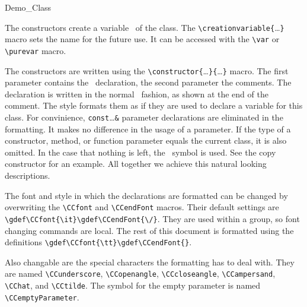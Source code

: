 \documentclass[12pt]{article}
\begin{document}
\begin{class}{Demo_Class}
{
\creation

The constructors create a variable \var\ of the class. The
\verb"\"\verb"creationvariable{"\ldots\verb"}" macro sets the name for the
future use. It can be accessed with the \verb"\"\verb"var" or
\verb"\"\verb"purevar" macro.

The constructors are written using the
\verb"\"\verb"constructor{"\ldots\verb"}{"\ldots\verb"}" macro. The first
parameter contains the \CC\ declaration, the second parameter the comments.
The declaration is written in the normal \CC\ fashion, as shown at the end
of the comment. The style formats them as if they are used
to declare a variable for this class. For convinience,
\verb"const"\ldots\verb"&" parameter declarations are eliminated in the
formatting. It makes no difference in the usage of a parameter. If the
type of a constructor, method, or function parameter equals the
current class, it is also omitted. In the case that nothing is left,
the \CCemptyParameter\ symbol is used. See the copy constructor for an
example. All together we achieve this natural looking descriptions.





The font and style in which the declarations are formatted can be
changed by overwriting the \verb"\CCfont" and \verb"\CCendFont"
macros. Their default settings are
\verb"\gdef\CCfont{\it}\gdef\CCendFont{\/}". They are used within a
group, so font changing commands are local. The rest of this document is
formatted using the definitions \verb"\gdef\CCfont{\tt}\gdef\CCendFont{}".

\gdef\CCfont{\tt}\gdef\CCendFont{}

\gdef\CCfont{\it}\gdef\CCendFont{\/}

Also changable are the special characters the formatting has to
deal with. They are named \verb"\CCunderscore", \verb"\CCopenangle",
\verb"\CCcloseangle", \verb"\CCampersand", \verb"\CChat", and
\verb"\CCtilde". The symbol for the empty parameter is named
\verb"\CCemptyParameter".

}
\end{class}
\end{document}
